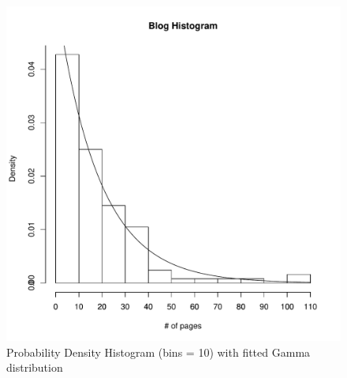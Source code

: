 \begin{figure}
  \centering
  \includegraphics[width=.7\linewidth]{../q1/densHist1.pdf}
  \caption{Probability Density Histogram (bins = 10) with fitted Gamma distribution}
\end{figure}


